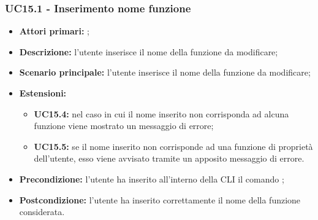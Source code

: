 \subsubsection{UC15.1 - Inserimento nome funzione }
\begin{itemize}
	\item \textbf{Attori primari:} \us{};
	\item \textbf{Descrizione:} l’utente inserisce il nome della funzione da modificare;
	\item \textbf{Scenario principale:} l’utente inserisce il nome della funzione da modificare;
	\item \textbf{Estensioni:} 
	\begin{itemize}
		\item \textbf{UC15.4:} nel caso in cui il nome inserito non corrisponda ad alcuna funzione viene mostrato un messaggio di errore; 
		\item \textbf{UC15.5:} se il nome inserito non corrisponde ad una funzione di proprietà dell'utente, esso viene avvisato tramite un apposito messaggio di errore.
	\end{itemize}
	\item \textbf{Precondizione:} l’utente ha inserito all’interno della CLI il comando \edit{};
	\item \textbf{Postcondizione:} l’utente ha inserito correttamente il nome della funzione considerata.
\end{itemize}